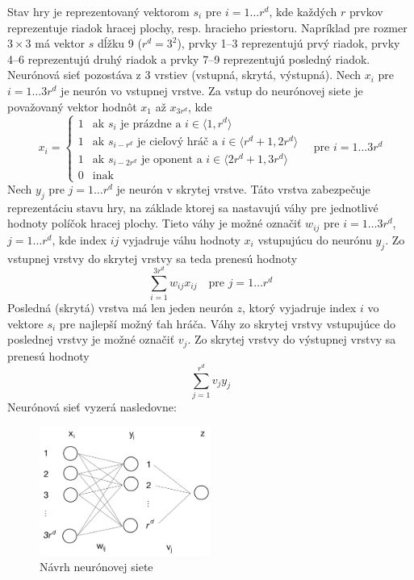 Stav hry je reprezentovaný vektorom $s_i$ pre $i=1 \dots r^d$, kde každých $r$ prvkov reprezentuje riadok hracej plochy,
resp. hracieho priestoru.
Napríklad pre rozmer $3 \times 3$ má vektor $s$ dĺžku 9 ($r^d=3^2$), prvky 1--3 reprezentujú prvý riadok, prvky
4--6 reprezentujú druhý riadok a prvky 7--9 reprezentujú posledný riadok.
Neurónová sieť pozostáva z 3 vrstiev (vstupná, skrytá, výstupná).
Nech $x_i$ pre $i=1 \dots 3r^d$ je neurón vo vstupnej vrstve.
Za vstup do neurónovej siete je považovaný vektor hodnôt $x_1$ až $x_{3r^d}$, kde
\begin{equation}
    x_i=
    \begin{cases}
        1 & \text{ak }s_i\text{ je prázdne a } i \in \langle 1, r^d \rangle \\
        1 & \text{ak }s_{i-r^d}\text{ je cieľový hráč a } i \in \langle r^d+1, 2r^d \rangle \\
        1 & \text{ak }s_{i-2r^d}\text{ je oponent a } i \in \langle 2r^d+1, 3r^d \rangle \\
        0 & \text{inak}
    \end{cases}
    \quad
    \text{pre }i=1 \dots 3r^d
\end{equation}
Nech $y_j$ pre $j=1 \dots r^d$ je neurón v skrytej vrstve.
Táto vrstva zabezpečuje reprezentáciu stavu hry, na základe ktorej sa nastavujú váhy pre jednotlivé hodnoty políčok
hracej plochy.
Tieto váhy je možné označiť $w_{ij}$ pre $i=1 \dots 3r^d$, $j=1 \dots r^d$, kde index $ij$ vyjadruje váhu hodnoty
$x_i$ vstupujúcu do neurónu $y_j$.
Zo vstupnej vrstvy do skrytej vrstvy sa teda prenesú hodnoty
\begin{equation}
    \sum_{i=1}^{3r^d} w_{ij}x_{ij} \quad \text{pre } j=1 \dots r^d
\end{equation}
Posledná (skrytá) vrstva má len jeden neurón $z$, ktorý vyjadruje index $i$ vo vektore $s_i$ pre najlepší možný ťah
hráča.
Váhy zo skrytej vrstvy vstupujúce do poslednej vrstvy je možné označiť $v_j$.
Zo skrytej vrstvy do výstupnej vrstvy sa prenesú hodnoty
\begin{equation}
    \sum_{j=1}^{r^d} v_{j}y_{j}
\end{equation}
Neurónová sieť vyzerá nasledovne:

\begin{figure}[H]
    \centering
    \includegraphics[width=0.5\textwidth]{images/ann.jpg}
    \caption{Návrh neurónovej siete}
\end{figure}


